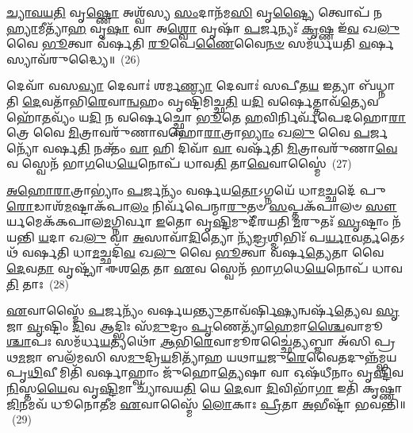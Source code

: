 \-\ul{𑌚𑍍𑌯𑌾}\-\-\ul{𑌵}\-\-\ul{𑌯}\-\-\ul{𑌤𑌿} 𑌵𑍃\-\ul{𑌷𑍍𑌣𑍋} 𑌅𑌶𑍍𑌵᳴𑌸𑍍𑌯 \ul{𑌸𑌂}\-𑌦𑌾𑌨᳴𑌮\-\ul{𑌸𑌿} 𑌵𑍃\-\ul{𑌷𑍍𑌟𑍍𑌯𑍈} 𑌤𑍍𑌵𑍋𑌪᳴ 𑌨\-\ul{𑌹𑍍𑌯𑌾}\-𑌮𑍀𑌤𑍍𑌯𑌾᳴\-\ul{𑌹} 𑌵𑍃\-\ul{𑌷𑌾} 𑌵𑌾 𑌅\-\ul{𑌶𑍍𑌵𑍋} 𑌵𑍃𑌷𑌾᳴ \ul{𑌪}\-𑌰𑍍𑌜𑌨𑍍𑌯𑌃᳴ \ul{𑌕𑍃}\-𑌷𑍍𑌣 𑌇᳴\-\ul{𑌵} 𑌖\-\ul{𑌲𑍁} 𑌵𑍈 \ul{𑌭𑍂}\-𑌤𑍍𑌵𑌾 𑌵᳴𑌰𑍍\mbox{}𑌷𑌤𑌿 \ul{𑌰𑍂}\-𑌪𑍇\-\ul{𑌣𑍈}\-𑌵𑍈\-\ul{𑌨}\-\-\ul{𑍞} 𑌸𑌮᳴𑌰𑍍𑌧𑌯𑌤𑌿 \ul{𑌵}\-𑌰𑍍\mbox{}𑌷𑌸𑍍𑌯𑌾𑌵᳴𑌰𑍁𑌦𑍍𑌧𑍍𑌯𑍈॥~(26)

{\anuvakamend[{\-\ul{𑌅}\-𑌷𑍍𑌟𑍗 𑌭𑌵᳴𑌨𑍍𑌤𑌿 𑌨𑌾\-\ul{𑌮}\-𑌧𑍇\-\ul{𑌯𑍈}\-𑌰𑍈\-\ul{𑌕𑌾}\-𑌨𑍍𑌨\-\ul{𑌤𑍍𑌰𑌿}\-\-\ul{𑍞}\-𑌶𑌚𑍍𑌚᳴}]}%

𑌦𑍇𑌵𑌾᳴ 𑌵𑌸\-\ul{𑌵𑍍𑌯𑌾} 𑌦𑍇𑌵𑌾𑌃॑ 𑌶𑌰𑍍𑌮\-\ul{𑌣𑍍𑌯𑌾} 𑌦𑍇𑌵𑌾𑌃॑ 𑌸𑌪𑍀𑌤\-\ul{𑌯} 𑌇𑌤𑍍𑌯𑌾 𑌬᳴𑌧𑍍𑌨𑌾𑌤𑌿 \ul{𑌦𑍇}\-𑌵𑌤𑌾᳴𑌭𑌿\-\ul{𑌰𑍇}\-𑌵𑌾\-\ul{𑌨𑍍𑌵}\-𑌹𑌂 𑌵𑍃𑌷𑍍𑌟𑌿᳴𑌮𑌿𑌚𑍍𑌛\-\ul{𑌤𑌿} 𑌯\-\ul{𑌦𑌿} 𑌵𑌰𑍍\mbox{}\-\ul{𑌷𑍇}\-𑌤𑍍𑌤𑌾𑌵᳴\-\ul{𑌤𑍍𑌯𑍇}\-𑌵 𑌹𑍋᳴\-\ul{𑌤}\-𑌵𑍍𑌯𑌂᳴ 𑌯\-\ul{𑌦𑌿} 𑌨 𑌵𑌰𑍍\mbox{}\-\ul{𑌷𑍇}\-𑌚𑍍𑌛𑍍𑌵𑍋 \ul{𑌭𑍂}\-𑌤𑍇 \ul{𑌹}\-𑌵𑌿𑌰𑍍𑌨𑌿𑌰𑍍𑌵᳴𑌪𑍇𑌦𑌹𑍋\-\ul{𑌰𑌾}\-𑌤𑍍𑌰𑍇 𑌵𑍈 \ul{𑌮𑌿}\-𑌤𑍍𑌰𑌾𑌵𑌰𑍁᳴𑌣𑌾𑌵𑌹𑍋\-\ul{𑌰𑌾}\-𑌤𑍍𑌰𑌾\-\ul{𑌭𑍍𑌯𑌾𑌂} 𑌖\-\ul{𑌲𑍁} 𑌵𑍈 \ul{𑌪}\-𑌰𑍍𑌜𑌨𑍍𑌯𑍋᳴ 𑌵𑌰𑍍\mbox{}𑌷\-\ul{𑌤𑌿} 𑌨𑌕𑍍𑌤𑌂᳴ \ul{𑌵𑌾} 𑌹𑌿 𑌦𑌿𑌵𑌾᳴ \ul{𑌵𑌾} 𑌵𑌰𑍍\mbox{}𑌷᳴𑌤𑌿 \ul{𑌮𑌿}\-𑌤𑍍𑌰𑌾𑌵𑌰𑍁᳴𑌣𑌾\-\ul{𑌵𑍇}\-𑌵 𑌸𑍍𑌵𑍇𑌨᳴ 𑌭𑌾\-\ul{𑌗}\-𑌧𑍇\-\ul{𑌯𑍇}\-𑌨𑍋𑌪᳴ 𑌧𑌾𑌵\-\ul{𑌤𑌿} 𑌤𑌾\-\ul{𑌵𑍇}\-𑌵𑌾𑌸𑍍𑌮𑍈॑~(27)

\-\ul{𑌅}\-\-\ul{𑌹𑍋}\-\-\ul{𑌰𑌾}\-𑌤𑍍𑌰𑌾\-𑌭𑍍𑌯𑌾𑌂॑ \ul{𑌪}\-𑌰𑍍𑌜𑌨𑍍𑌯𑌂᳴ 𑌵𑌰𑍍\mbox{}𑌷𑌯\-\ul{𑌤𑍋}\-\-𑌽𑌗𑍍𑌨𑌯𑍇᳴ 𑌧𑌾\-\ul{𑌮}\-𑌚𑍍𑌛𑌦𑍇᳴ 𑌪𑍁\-\ul{𑌰𑍋}\-𑌡𑌾𑌶᳴\-\-\ul{𑌮}\-𑌷𑍍𑌟𑌾\-𑌕᳴𑌪𑌾\-\ul{𑌲𑌂} 𑌨𑌿𑌰𑍍𑌵᳴𑌪𑍇𑌨𑍍𑌮𑌾\-\ul{𑌰𑍁}\-𑌤𑍞 \ul{𑌸}\-𑌪𑍍𑌤𑌕᳴𑌪𑌾𑌲𑍞 \ul{𑌸𑍗}\-𑌰𑍍𑌯𑌮𑍇𑌕᳴𑌕𑌪𑌾𑌲\-\ul{𑌮}\-𑌗𑍍𑌨𑌿𑌰𑍍𑌵𑌾 \ul{𑌇}\-𑌤𑍋 𑌵𑍃\-\ul{𑌷𑍍𑌟𑌿}\-𑌮𑍁𑌦𑍀᳴𑌰𑌯𑌤𑌿 \ul{𑌮}\-𑌰𑍁𑌤𑌃᳴ \ul{𑌸𑍃}\-𑌷𑍍𑌟𑌾𑌂 𑌨᳴𑌯𑌨𑍍𑌤𑌿 \ul{𑌯}\-𑌦𑌾 𑌖\-\ul{𑌲𑍁} 𑌵𑌾 \ul{𑌅}\-𑌸𑌾𑌵𑌾᳴\-\ul{𑌦𑌿}\-𑌤𑍍𑌯𑍋 𑌨𑍍𑌯᳴\-\ul{𑌙𑍍𑌰}\-𑌶𑍍𑌮𑌿𑌭𑌿𑌃᳴ 𑌪\-\ul{𑌰𑍍𑌯𑌾}\-𑌵\-\ul{𑌰𑍍𑌤}\-𑌤𑍇\-𑌽𑌥᳴ 𑌵𑌰𑍍\mbox{}𑌷𑌤𑌿 𑌧𑌾\-\ul{𑌮}\-𑌚𑍍𑌛𑌦𑌿᳴\-\ul{𑌵} 𑌖\-\ul{𑌲𑍁} 𑌵𑍈 \ul{𑌭𑍂}\-𑌤𑍍𑌵𑌾 𑌵᳴𑌰𑍍\mbox{}𑌷\-\ul{𑌤𑍍𑌯𑍇}\-𑌤𑌾 𑌵𑍈 \ul{𑌦𑍇}\-𑌵\-\ul{𑌤𑌾} 𑌵𑍃𑌷𑍍𑌟𑍍𑌯𑌾᳴ 𑌈𑌶\-\ul{𑌤𑍇} 𑌤𑌾 \ul{𑌏}\-𑌵 𑌸𑍍𑌵𑍇𑌨᳴ 𑌭𑌾\-\ul{𑌗}\-𑌧𑍇\-\ul{𑌯𑍇}\-𑌨𑍋𑌪᳴ 𑌧𑌾𑌵\-\ul{𑌤𑌿} 𑌤𑌾𑌃~(28)

\-\ul{𑌏}\-𑌵𑌾𑌸𑍍𑌮𑍈᳴ \ul{𑌪}\-𑌰𑍍𑌜𑌨𑍍𑌯𑌂᳴ 𑌵𑌰𑍍\mbox{}𑌷𑌯\-\ul{𑌨𑍍𑌤𑍍𑌯𑍁}\-𑌤𑌾𑌵᳴𑌰𑍍\mbox{}𑌷𑌿\-\ul{𑌷𑍍𑌯}\-𑌨𑍍𑌵𑌰𑍍\mbox{}𑌷᳴\-\ul{𑌤𑍍𑌯𑍇}\-𑌵 \ul{𑌸𑍃}\-𑌜𑌾 \ul{𑌵𑍃}\-𑌷𑍍𑌟𑌿𑌂 \ul{𑌦𑌿}\-𑌵 𑌆𑌦𑍍𑌭𑌿𑌃 𑌸᳴\-\ul{𑌮𑍁}\-𑌦𑍍𑌰𑌂 \ul{𑌪𑍃}\-𑌣𑍇𑌤𑍍𑌯𑌾᳴\-\ul{𑌹𑍇}\-𑌮𑌾\-\ul{𑌶𑍍𑌚𑍈}\-𑌵𑌾𑌮𑍂\-\ul{𑌶𑍍𑌚𑌾}\-𑌪𑌃 𑌸𑌮᳴𑌰𑍍𑌧\-\ul{𑌯}\-𑌤𑍍𑌯𑌥𑍋᳴ \ul{𑌆}\-𑌭𑌿\-\ul{𑌰𑍇}\-𑌵𑌾𑌮𑍂𑌰𑌚𑍍𑌛𑍈॑\-\ul{𑌤𑍍𑌯}\-𑌬𑍍𑌜𑌾 𑌅᳴𑌸𑌿 𑌪𑍍𑌰𑌥\-\ul{𑌮}\-𑌜𑌾 𑌬𑌲᳴𑌮𑌸𑌿 𑌸\-\ul{𑌮𑍁}\-𑌦𑍍𑌰𑌿\-\ul{𑌯}\-𑌮𑌿𑌤𑍍𑌯𑌾᳴𑌹 𑌯𑌥𑌾\-\ul{𑌯}\-𑌜𑍁\-\ul{𑌰𑍇}\-𑌵𑍈𑌤𑌦𑍁𑌨𑍍𑌨᳴𑌮𑍍𑌭𑌯 𑌪𑍃\-\ul{𑌥𑌿}\-𑌵𑍀𑌮𑌿𑌤𑌿᳴ 𑌵𑌰𑍍\mbox{}\-\ul{𑌷𑌾}\-𑌹𑍍𑌵𑌾𑌂 𑌜𑍁᳴𑌹𑍋\-\ul{𑌤𑍍𑌯𑍇}\-𑌷𑌾 𑌵𑌾 𑌓𑌷᳴𑌧𑍀𑌨𑌾𑌂 𑌵𑍃\-\ul{𑌷𑍍𑌟𑌿}\-𑌵\-\ul{𑌨𑌿}\-𑌸𑍍𑌤\-\ul{𑌯𑍈}\-𑌵 𑌵𑍃\-\ul{𑌷𑍍𑌟𑌿}\-𑌮𑌾 𑌚𑍍𑌯𑌾᳴𑌵𑌯\-\ul{𑌤𑌿} 𑌯𑍇 \ul{𑌦𑍇}\-𑌵𑌾 \ul{𑌦𑌿}\-𑌵𑌿𑌭𑌾᳴\-\ul{𑌗𑌾} 𑌇𑌤𑌿᳴ 𑌕𑍃𑌷𑍍𑌣𑌾\-\ul{𑌜𑌿}\-𑌨𑌮𑌵᳴ 𑌧𑍂𑌨𑍋\-\ul{𑌤𑍀}\-𑌮 \ul{𑌏}\-𑌵𑌾𑌸𑍍𑌮𑍈᳴ \ul{𑌲𑍋}\-𑌕𑌾𑌃 \ul{𑌪𑍍𑌰𑍀}\-𑌤𑌾 \ul{𑌅}\-𑌭𑍀𑌷𑍍𑌟𑌾᳴ 𑌭𑌵𑌨𑍍𑌤𑌿॥~(29)

